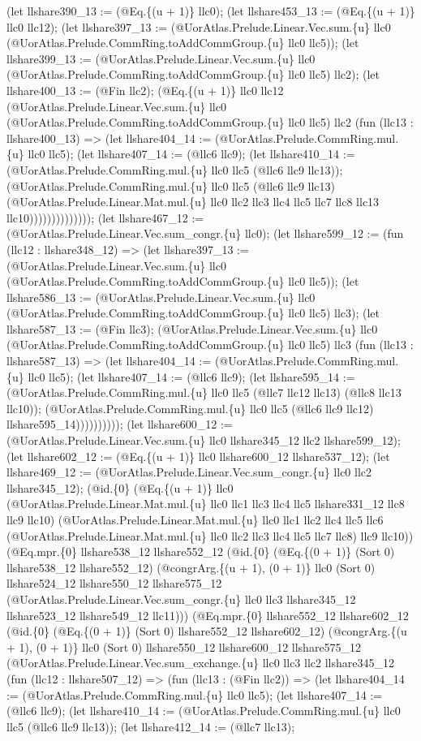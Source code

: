 \documentclass[11pt]{article}
\begin{document}
(let llshare390\_13 := (@Eq.\{(u + 1)\} llc0); (let llshare453\_13 := (@Eq.\{(u + 1)\} llc0 llc12); (let llshare397\_13 := (@UorAtlas.Prelude.Linear.Vec.sum.\{u\} llc0 (@UorAtlas.Prelude.CommRing.toAddCommGroup.\{u\} llc0 llc5)); (let llshare399\_13 := (@UorAtlas.Prelude.Linear.Vec.sum.\{u\} llc0 (@UorAtlas.Prelude.CommRing.toAddCommGroup.\{u\} llc0 llc5) llc2); (let llshare400\_13 := (@Fin llc2); (@Eq.\{(u + 1)\} llc0 llc12 (@UorAtlas.Prelude.Linear.Vec.sum.\{u\} llc0 (@UorAtlas.Prelude.CommRing.toAddCommGroup.\{u\} llc0 llc5) llc2 (fun (llc13 : llshare400\_13) => (let llshare404\_14 := (@UorAtlas.Prelude.CommRing.mul.\{u\} llc0 llc5); (let llshare407\_14 := (@llc6 llc9); (let llshare410\_14 := (@UorAtlas.Prelude.CommRing.mul.\{u\} llc0 llc5 (@llc6 llc9 llc13)); (@UorAtlas.Prelude.CommRing.mul.\{u\} llc0 llc5 (@llc6 llc9 llc13) (@UorAtlas.Prelude.Linear.Mat.mul.\{u\} llc0 llc2 llc3 llc4 llc5 llc7 llc8 llc13 llc10)))))))))))))); (let llshare467\_12 := (@UorAtlas.Prelude.Linear.Vec.sum\_congr.\{u\} llc0); (let llshare599\_12 := (fun (llc12 : llshare348\_12) => (let llshare397\_13 := (@UorAtlas.Prelude.Linear.Vec.sum.\{u\} llc0 (@UorAtlas.Prelude.CommRing.toAddCommGroup.\{u\} llc0 llc5)); (let llshare586\_13 := (@UorAtlas.Prelude.Linear.Vec.sum.\{u\} llc0 (@UorAtlas.Prelude.CommRing.toAddCommGroup.\{u\} llc0 llc5) llc3); (let llshare587\_13 := (@Fin llc3); (@UorAtlas.Prelude.Linear.Vec.sum.\{u\} llc0 (@UorAtlas.Prelude.CommRing.toAddCommGroup.\{u\} llc0 llc5) llc3 (fun (llc13 : llshare587\_13) => (let llshare404\_14 := (@UorAtlas.Prelude.CommRing.mul.\{u\} llc0 llc5); (let llshare407\_14 := (@llc6 llc9); (let llshare595\_14 := (@UorAtlas.Prelude.CommRing.mul.\{u\} llc0 llc5 (@llc7 llc12 llc13) (@llc8 llc13 llc10)); (@UorAtlas.Prelude.CommRing.mul.\{u\} llc0 llc5 (@llc6 llc9 llc12) llshare595\_14)))))))))); (let llshare600\_12 := (@UorAtlas.Prelude.Linear.Vec.sum.\{u\} llc0 llshare345\_12 llc2 llshare599\_12); (let llshare602\_12 := (@Eq.\{(u + 1)\} llc0 llshare600\_12 llshare537\_12); (let llshare469\_12 := (@UorAtlas.Prelude.Linear.Vec.sum\_congr.\{u\} llc0 llc2 llshare345\_12); (@id.\{0\} (@Eq.\{(u + 1)\} llc0 (@UorAtlas.Prelude.Linear.Mat.mul.\{u\} llc0 llc1 llc3 llc4 llc5 llshare331\_12 llc8 llc9 llc10) (@UorAtlas.Prelude.Linear.Mat.mul.\{u\} llc0 llc1 llc2 llc4 llc5 llc6 (@UorAtlas.Prelude.Linear.Mat.mul.\{u\} llc0 llc2 llc3 llc4 llc5 llc7 llc8) llc9 llc10)) (@Eq.mpr.\{0\} llshare538\_12 llshare552\_12 (@id.\{0\} (@Eq.\{(0 + 1)\} (Sort 0) llshare538\_12 llshare552\_12) (@congrArg.\{(u + 1), (0 + 1)\} llc0 (Sort 0) llshare524\_12 llshare550\_12 llshare575\_12 (@UorAtlas.Prelude.Linear.Vec.sum\_congr.\{u\} llc0 llc3 llshare345\_12 llshare523\_12 llshare549\_12 llc11))) (@Eq.mpr.\{0\} llshare552\_12 llshare602\_12 (@id.\{0\} (@Eq.\{(0 + 1)\} (Sort 0) llshare552\_12 llshare602\_12) (@congrArg.\{(u + 1), (0 + 1)\} llc0 (Sort 0) llshare550\_12 llshare600\_12 llshare575\_12 (@UorAtlas.Prelude.Linear.Vec.sum\_exchange.\{u\} llc0 llc3 llc2 llshare345\_12 (fun (llc12 : llshare507\_12) => (fun (llc13 : (@Fin llc2)) => (let llshare404\_14 := (@UorAtlas.Prelude.CommRing.mul.\{u\} llc0 llc5); (let llshare407\_14 := (@llc6 llc9); (let llshare410\_14 := (@UorAtlas.Prelude.CommRing.mul.\{u\} llc0 llc5 (@llc6 llc9 llc13)); (let llshare412\_14 := (@llc7 llc13); 
\end{document}
